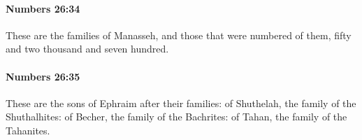 		\paragraph{Numbers 26:34} %
			\label{NUMBERS-26-34}

			These are the families of Manasseh, and those that were numbered of them, fifty and two thousand and seven hundred.


		\paragraph{Numbers 26:35} %
			\label{NUMBERS-26-35}

			These are the sons of Ephraim after their families: of Shuthelah, the family of the Shuthalhites: of Becher, the family of the Bachrites: of Tahan, the family of the Tahanites.


